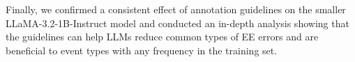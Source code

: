 Finally, we confirmed a consistent effect of annotation guidelines on the smaller LLaMA-3.2-1B-Instruct model and conducted an in-depth analysis showing that the guidelines can help LLMs reduce common types of EE errors and are beneficial to event types with any frequency in the training set.


% 
% 




